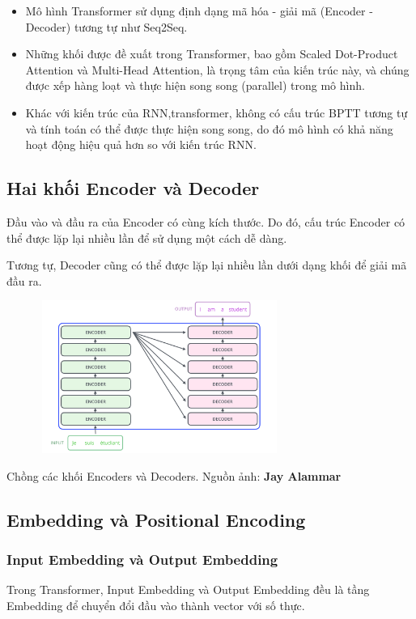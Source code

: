 \documentclass[a4paper, 10pt]{article}
\begin{document}
\begin{itemize}
    \item  Mô hình Transformer sử dụng định dạng mã hóa - giải mã (Encoder - Decoder) 
    tương tự như Seq2Seq.
    \item  Những khối được đề xuất trong Transformer, bao gồm Scaled Dot-Product 
    Attention và Multi-Head Attention, là trọng tâm của kiến trúc này, và chúng 
    được xếp hàng loạt và thực hiện song song (parallel) trong mô hình.
    \item Khác với kiến trúc của RNN,transformer, không có cấu trúc BPTT tương tự và tính toán 
    có thể được thực hiện song song, do đó mô hình có khả năng hoạt động hiệu quả
    hơn so với kiến trúc RNN.
\end{itemize}

\subsection{Hai khối Encoder và Decoder}
Đầu vào và đầu ra của Encoder có cùng kích thước. Do đó, cấu trúc Encoder có thể
được lặp lại nhiều lần để sử dụng một cách dễ dàng.

Tương tự, Decoder cũng có thể được lặp lại 
nhiều lần dưới dạng khối để giải mã đầu ra.

\begin{minipage}{\linewidth}
    \captionsetup{type=figure}
    \centering
    \includegraphics[width=10cm, height=5cm]{./The_transformer_encoder_decoder_stack.png}
    \caption{Chồng các khối Encoders và Decoders. Nguồn ảnh: \textbf{Jay Alammar}}
\end{minipage}

\subsection{Embedding và Positional Encoding}
\subsubsection {Input Embedding và Output Embedding}
Trong Transformer, Input Embedding và Output Embedding đều là tầng Embedding 
để chuyển đổi đầu vào thành vector với số thực.
\end{document}
